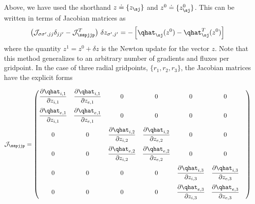 %
Above, we have used the shorthand $z \doteq \{z_\sj\}$ and 
$z^0 \doteq \{z^0_\sj\}$.  This can be written in terms of 
Jacobian matrices as
%
\begin{equation}
\left( {\cal J}_{\sigma\sigma^\prime,jj} \delta_{jj^\prime}
      -{\cal J}^T_{\sspjjp} \right) 
 \, \delta z_{\sigma^\prime,j^\prime} = 
 -\left[ \qhat_\sj(z^0) - \qhat^T_\sj(z^0) \right]
\end{equation}
%
where the quantity $z^1 = z^0 + \delta z$ is the Newton 
update for the vector $z$.  Note that this method generalizes 
to an arbitrary number of gradients and fluxes per gridpoint.  
In the case of three radial gridpoints, $\{r_1,r_2,r_3\}$, 
the Jacobian matrices have the explicit forms

\begin{equation}
{\cal J}_{\sspjjp} = \begin{pmatrix}
\displaystyle \frac{\partial \qhat_{i,1}}{\partial z_{i,1}} &
\displaystyle \frac{\partial \qhat_{i,1}}{\partial z_{e,1}} &
0 & 0 & 0 & 0 \medskip \\
\displaystyle \frac{\partial \qhat_{e,1}}{\partial z_{i,1}} &
\displaystyle \frac{\partial \qhat_{e,1}}{\partial z_{e,1}} &
0 & 0 & 0 & 0 \medskip \\
0 & 0 &
\displaystyle \frac{\partial \qhat_{i,2}}{\partial z_{i,2}} &
\displaystyle \frac{\partial \qhat_{i,2}}{\partial z_{e,2}} &
0 & 0  \medskip \\
0 & 0 &
\displaystyle \frac{\partial \qhat_{e,2}}{\partial z_{i,2}} &
\displaystyle \frac{\partial \qhat_{e,2}}{\partial z_{e,2}} &
0 & 0  \medskip \\
0 & 0 & 0 & 0 &
\displaystyle \frac{\partial \qhat_{i,3}}{\partial z_{i,3}} &
\displaystyle \frac{\partial \qhat_{i,3}}{\partial z_{e,3}} &
\medskip \\
0 & 0 & 0 & 0 &
\displaystyle \frac{\partial \qhat_{e,3}}{\partial z_{i,3}} &
\displaystyle \frac{\partial \qhat_{e,3}}{\partial z_{e,3}} &
\end{pmatrix}
\end{equation}

